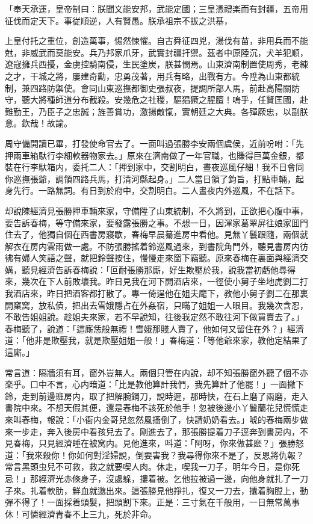 \begin{myquote}[\markfont]
「奉天承運，皇帝制曰：朕聞文能安邦，武能定國；三皇憑禮楽而有封疆，五帝用征伐而定天下。事従順逆，人有賢愚。朕承祖宗不拔之洪基，

上皇付托之重位，創造萬事，惕然悚懼。自古舜征四兇，湯伐有苗，非用兵而不能尅，非威武而莫能安。兵乃邦家爪牙，武實封疆扞禦。茲者中原陸沉，犬羊犯順，遼寇擁兵西擾，金虜控騎南侵，生民塗炭，朕甚憫焉。山東濟南制置使周秀，老練之才，干城之將，屢建奇勳，忠勇茂著，用兵有略，出戰有方。今陞為山東都統制，兼四路防禦使。會同山東巡撫都御史張叔夜，提調所部人馬，前赴高陽關防守，聽大將種師道分布截殺。安幾危之社稷，驅猖獗之腥膻！嗚乎，任賢匡國，赴難勤王，乃臣子之忠誠；旌善賞功，激揚敵愾，實朝廷之大典。各殫厥忠，以副朕意。欽哉！故諭。


\end{myquote}

周守備開讀已畢，打發使命官去了。一面叫過張勝李安兩個虞侯，近前吩咐：「先押兩車箱馱行李細軟器物家去。」原來在濟南做了一年官職，也賺得巨萬金銀，都裝在行李馱箱内，委托二人：「押到家中，交割明白，晝夜巡風仔細！我不日會同你巡撫張爺，調領四路兵馬，打清河縣起身。」二人當日領了鈞旨，打點車輛，起身先行。一路無詞。有日到於府中，交割明白。二人晝夜内外巡風，不在話下。

却說陳經濟見張勝押車輛來家，守備陞了山東統制，不久將到，正欲把心腹中事，要告訴春梅，等守備來家，要發露張勝之事。不想一日，因渾家葛翠屏往娘家囬門住去了，他獨自個在西書房寢歇，春梅早晨驀進房中看他。見無丫鬟跟隨，兩個就解衣在房内雲雨做一處。不防張勝搖着鈴巡風過來，到書院角門外，聽見書房内彷彿有婦人笑語之聲，就把鈴聲按住，慢慢走來窗下竊聽。原來春梅在裏面與經濟交媾，聽見經濟告訴春梅說：「叵耐張勝那廝，好生欺壓於我，說我當初虧他尋得來，幾次在下人前敗壞我。昨日見我在河下開酒店來，一徑使小舅子坐地虎劉二打我酒店來，昨日把酒客都打散了。專一倚逞他在姐夫麾下，教他小舅子劉二在那裏開窠窝，放私債，把出去雪娥隱占在外姦宿，只瞞了姐姐一人眼目。我幾次含忍，不敢告姐姐說。趁姐夫來家，若不早說知，往後我定然不敢往河下做買賣去了。」春梅聽了，說道：「這廝恁般無禮！雪娥那賤人賣了，他如何又留住在外？」經濟道：「他非是欺壓我，就是欺壓姐姐一般！」春梅道：「等他爺來家，教他定結果了這廝。」

常言道：隔牆須有耳，窗外豈無人。兩個只管在内說，却不知張勝窗外聽了個不亦楽乎。口中不言，心内暗道：「比是教他算計我們，我先算計了他罷！」一面撇下鈴，走到前邊班房内，取了把解腕鋼刀，說時遲，那時快，在石上磨了兩磨，走入書院中來。不想天假其便，還是春梅不該死於他手！忽被後邊小丫鬟蘭花兒慌慌走來叫春梅，報說：「小衙内金哥兒忽然風搐倒了，快請奶奶看去。」唬的春梅兩步做來一步走，奔入後房中看孩兒去了。剛進去了，那張勝提着刀子逕奔到書房内，不見春梅，只見經濟睡在被窝内。見他進來，呌道：「阿呀，你來做甚麽？」張勝怒道：「我來殺你！你如何對淫婦說，倒要害我？我尋得你來不是了，反恩將仇報？常言黑頭虫兒不可救，救之就要喫人肉。休走，喫我一刀子，明年今日，是你死忌！」那經濟光赤條身子，沒處躲，摟着被。乞他拉被過一邊，向他身就扎了一刀子來。扎着軟肋，鮮血就邈出來。這張勝見他掙扎，復又一刀去，攮着胸膛上，動彈不得了！一面採着頭髮，把頭割下來。正是：三寸氣在千般用，一日無常萬事休！可憐經濟青春不上三九，死於非命。

